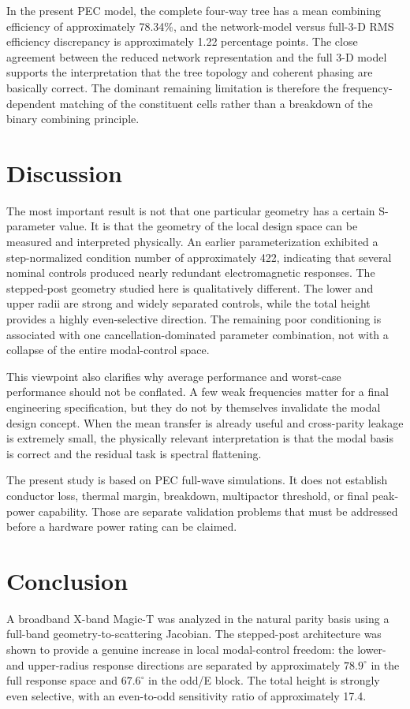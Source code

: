\documentclass[journal]{IEEEtran}
\begin{document}
In the present PEC model, the complete four-way tree has a mean combining efficiency of approximately 78.34\%, and the network-model versus full-3-D RMS efficiency discrepancy is approximately 1.22 percentage points.
The close agreement between the reduced network representation and the full 3-D model supports the interpretation that the tree topology and coherent phasing are basically correct.
The dominant remaining limitation is therefore the frequency-dependent matching of the constituent cells rather than a breakdown of the binary combining principle.

\section{Discussion}
The most important result is not that one particular geometry has a certain S-parameter value.
It is that the geometry of the local design space can be measured and interpreted physically.
An earlier parameterization exhibited a step-normalized condition number of approximately 422, indicating that several nominal controls produced nearly redundant electromagnetic responses.
The stepped-post geometry studied here is qualitatively different.
The lower and upper radii are strong and widely separated controls, while the total height provides a highly even-selective direction.
The remaining poor conditioning is associated with one cancellation-dominated parameter combination, not with a collapse of the entire modal-control space.

This viewpoint also clarifies why average performance and worst-case performance should not be conflated.
A few weak frequencies matter for a final engineering specification, but they do not by themselves invalidate the modal design concept.
When the mean transfer is already useful and cross-parity leakage is extremely small, the physically relevant interpretation is that the modal basis is correct and the residual task is spectral flattening.

The present study is based on PEC full-wave simulations.
It does not establish conductor loss, thermal margin, breakdown, multipactor threshold, or final peak-power capability.
Those are separate validation problems that must be addressed before a hardware power rating can be claimed.

\section{Conclusion}
A broadband X-band Magic-T was analyzed in the natural parity basis using a full-band geometry-to-scattering Jacobian.
The stepped-post architecture was shown to provide a genuine increase in local modal-control freedom: the lower- and upper-radius response directions are separated by approximately $78.9^\circ$ in the full response space and $67.6^\circ$ in the odd/E block.
The total height is strongly even selective, with an even-to-odd sensitivity ratio of approximately 17.4.
\end{document}

